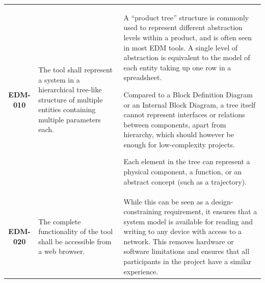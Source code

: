 \documentclass[a4paper,nobib,justified,final]{tufte-book}
\begin{document}
\begin{table}[h]
	\footnotesize
	\def\arraystretch{1.05}
	\begin{tabularx}{\textwidth}{cp{4cm}X}
		\toprule
		\textbf{EDM-010} & The tool shall represent a system in a hierarchical tree-like structure of multiple entities containing multiple parameters each. & 
		A ``product tree'' structure is commonly used to represent different abstraction levels within a product, and is often seen in most \ac{EDM} tools. A single level of abstraction is equivalent to the model of each entity taking up one row in a spreadsheet.
		
		Compared to a Block Definition Diagram or an Internal Block Diagram, a tree itself cannot represent interfaces or relations between components, apart from hierarchy, which should however be enough for low-complexity projects.
		
		Each element in the tree can represent a physical component, a function, or an abstract concept (such as a trajectory).

		\\
		\textbf{EDM-020} & The complete functionality of the tool shall be accessible from a web browser. &
		While this can be seen as a design-constraining requirement, it ensures that a system model is available for reading and writing to any device with access to a network. This removes hardware or software limitations and ensures that all participants in the project have a similar experience.
		
		

\end{tabularx}
\end{table}
\end{document}
